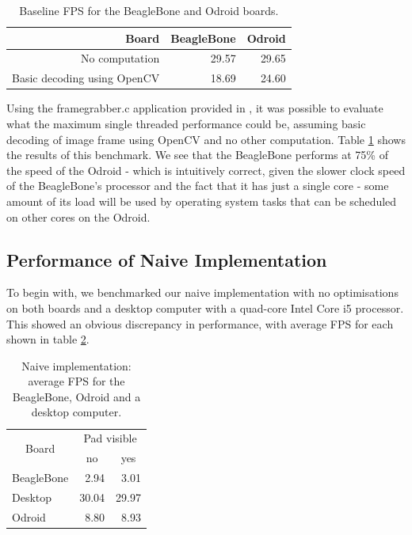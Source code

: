 \documentclass{acm_proc_article-sp}
\begin{document}
\begin{table}[htbp]
  \centering
    \begin{tabular}{rrr}
    \toprule
    \textbf{Board} & \textbf{BeagleBone} & \textbf{Odroid} \\
    \midrule
    No computation & 29.57 & 29.65 \\
    Basic decoding using OpenCV & 18.69 & 24.60 \\
    \bottomrule
    \end{tabular}%
    \caption{Baseline FPS for the BeagleBone and Odroid boards.}
 \label{tab:baseline}
\end{table}%

Using the framegrabber.c application provided in \cite{bbb-30fps}, it was possible to evaluate what the maximum single threaded performance could be, assuming basic decoding of image frame using OpenCV and no other computation. Table \ref{tab:baseline} shows the results of this benchmark. We see that the BeagleBone performs at 75\% of the speed of the Odroid - which is intuitively correct, given the slower clock speed of the BeagleBone's processor and the fact that it has just a single core - some amount of its load will be used by operating system tasks that can be scheduled on other cores on the Odroid. 

\subsection{Performance of Naive Implementation}
To begin with, we benchmarked our naive implementation with no optimisations on both boards and a desktop computer with a quad-core Intel Core i5 processor. This showed an obvious discrepancy in performance, with average FPS for each shown in table \ref{tab:naive-all-fps}.

\begin{table}[htbp]
  \centering
    \begin{tabular}{rrr}
    \toprule
    \multicolumn{1}{c}{\multirow{2}[1]{*}{Board}} & \multicolumn{2}{c}{Pad visible} \\
    \multicolumn{1}{c}{} & \multicolumn{1}{c}{no} & \multicolumn{1}{c}{yes} \\
    \midrule 
    \multicolumn{1}{l}{BeagleBone} & 2.94  & 3.01 \\
    \multicolumn{1}{l}{Desktop} & 30.04 & 29.97 \\
    \multicolumn{1}{l}{Odroid} & 8.80  & 8.93 \\
    \bottomrule
    \end{tabular}%
   \caption{Naive implementation: average FPS for the BeagleBone, Odroid and a desktop computer.}%
  \label{tab:naive-all-fps}%
\end{table}%
\end{document}
